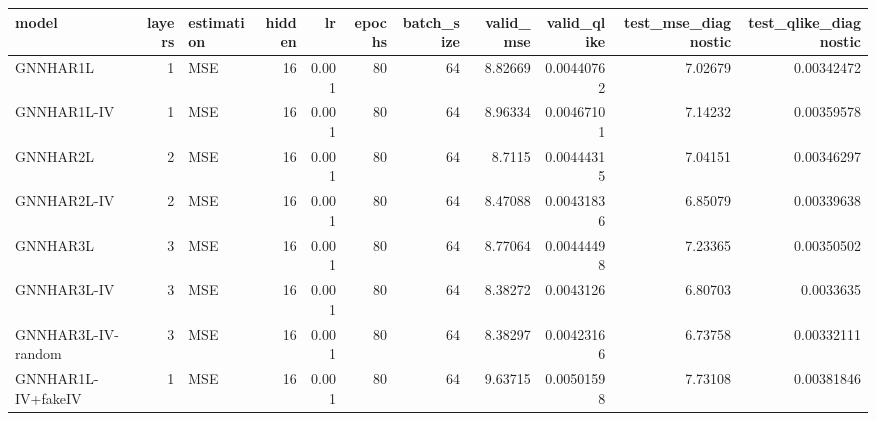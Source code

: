 \begin{tabular}{lrlrrrrrrrr}
\toprule
model & layers & estimation & hidden & lr & epochs & batch_size & valid_mse & valid_qlike & test_mse_diagnostic & test_qlike_diagnostic \\
\midrule
GNNHAR1L & 1 & MSE & 16 & 0.001 & 80 & 64 & 8.82669 & 0.00440762 & 7.02679 & 0.00342472 \\
GNNHAR1L-IV & 1 & MSE & 16 & 0.001 & 80 & 64 & 8.96334 & 0.00467101 & 7.14232 & 0.00359578 \\
GNNHAR2L & 2 & MSE & 16 & 0.001 & 80 & 64 & 8.7115 & 0.00444315 & 7.04151 & 0.00346297 \\
GNNHAR2L-IV & 2 & MSE & 16 & 0.001 & 80 & 64 & 8.47088 & 0.00431836 & 6.85079 & 0.00339638 \\
GNNHAR3L & 3 & MSE & 16 & 0.001 & 80 & 64 & 8.77064 & 0.00444498 & 7.23365 & 0.00350502 \\
GNNHAR3L-IV & 3 & MSE & 16 & 0.001 & 80 & 64 & 8.38272 & 0.0043126 & 6.80703 & 0.0033635 \\
GNNHAR3L-IV-random & 3 & MSE & 16 & 0.001 & 80 & 64 & 8.38297 & 0.00423166 & 6.73758 & 0.00332111 \\
GNNHAR1L-IV+fakeIV & 1 & MSE & 16 & 0.001 & 80 & 64 & 9.63715 & 0.00501598 & 7.73108 & 0.00381846 \\
\bottomrule
\end{tabular}
